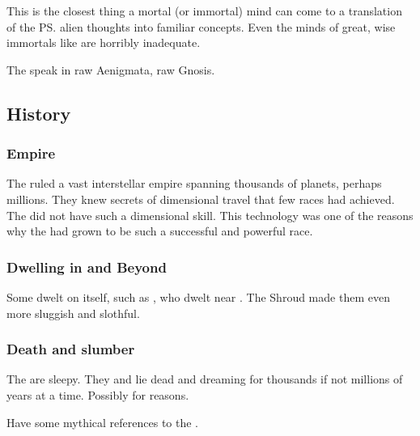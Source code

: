 This is the closest thing a mortal (or immortal) mind can come to a translation of the \ps{\xss} alien thoughts into familiar concepts. 
Even the minds of great, wise immortals like \QuessanthIshnaruchaefir{} are horribly inadequate. 

The \xss{} speak in raw Aenigmata, raw Gnosis. 










\subsection{History}





\subsubsection{Empire}
The \xss ruled a vast interstellar empire spanning thousands of planets, perhaps millions. 
They knew secrets of dimensional travel that few races had achieved.
The \banes did not have such a dimensional \travelling skill. 
This technology was one of the reasons why the \xss had grown to be such a successful and powerful race. 




\subsubsection{Dwelling in \Miith and Beyond}
Some \xss dwelt on \Miith itself, such as , who dwelt near \Yormis.
The Shroud made them even more sluggish and slothful. 





\subsubsection{Death and slumber}
The \xss{} are sleepy. They  and lie dead and dreaming for thousands if not millions of years at a time. 
Possibly for  reasons. 

Have some mythical references to the .

